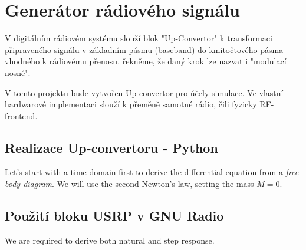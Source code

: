 \section{Generátor rádiového signálu}


\marginpar{\textcolor{txt_blue}{up-convertor}} 
V digitálním rádiovém systému slouží blok "Up-Convertor" k transformaci připraveného signálu v základním pásmu (baseband) do kmitočtového pásma vhodného k rádiovému přenosu. řekněme, že daný krok lze nazvat i "modulací nosné".

V tomto projektu bude vytvořen Up-convertor pro účely simulace. Ve vlastní hardwarové implementaci slouží k přeměně samotné rádio, čili fyzicky RF-frontend.


\subsection{Realizace Up-convertoru - Python}
\marginpar{\textcolor{txt_blue}{Rozbor}} 
Let's start with a time-domain first to derive the differential equation from a \textsl{free-body diagram}. We will use the second Newton's law, setting the mass $M=0$.


\subsection{Použití bloku USRP v GNU Radio}
We are required to derive both natural and step response.




